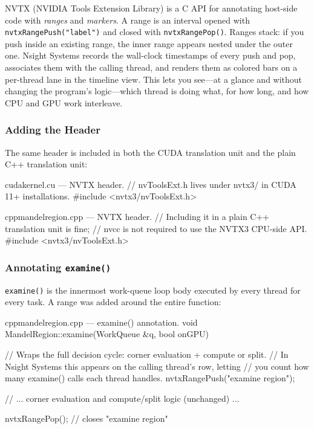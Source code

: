 \documentclass[
	english,
	letterpaper, oneside
]{article}
\begin{document}
NVTX (NVIDIA Tools Extension Library) is a C API for annotating host-side
code with \emph{ranges} and \emph{markers}. A range is an interval opened
with \texttt{nvtxRangePush("label")} and closed with \texttt{nvtxRangePop()}.
Ranges stack: if you push inside an existing range, the inner range appears
nested under the outer one. Nsight Systems records the wall-clock timestamps
of every push and pop, associates them with the calling thread, and renders
them as colored bars on a per-thread lane in the timeline view. This lets
you see—at a glance and without changing the program's logic—which thread is
doing what, for how long, and how CPU and GPU work interleave.

\subsubsection{Adding the Header}

The same header is included in both the CUDA translation unit and the plain
C++ translation unit:

\begin{sourcecode}{cuda}{kernel.cu — NVTX header.}
// nvToolsExt.h lives under nvtx3/ in CUDA 11+ installations.
#include <nvtx3/nvToolsExt.h>
\end{sourcecode}

\begin{sourcecode}{cpp}{mandelregion.cpp — NVTX header.}
// Including it in a plain C++ translation unit is fine;
// nvcc is not required to use the NVTX3 CPU-side API.
#include <nvtx3/nvToolsExt.h>
\end{sourcecode}

\subsubsection{Annotating \texttt{examine()}}

\texttt{examine()} is the innermost work-queue loop body executed by every
thread for every task. A range was added around the entire function:

\begin{sourcecode}{cpp}{mandelregion.cpp — examine() annotation.}
void MandelRegion::examine(WorkQueue &q, bool onGPU)
{
    // Wraps the full decision cycle: corner evaluation + compute or split.
    // In Nsight Systems this appears on the calling thread's row, letting
    // you count how many examine() calls each thread handles.
    nvtxRangePush("examine region");

    // ... corner evaluation and compute/split logic (unchanged) ...

    nvtxRangePop(); // closes "examine region"
}
\end{sourcecode}
\end{document}
